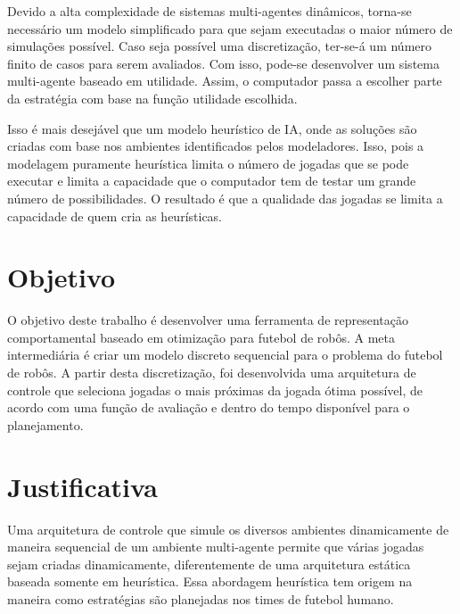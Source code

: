 Devido a alta complexidade de sistemas multi-agentes dinâmicos, torna-se
necessário um modelo simplificado para que sejam executadas o maior número de
simulações possível.  Caso seja possível uma discretização, ter-se-á um número
finito de casos para serem avaliados.  Com isso, pode-se desenvolver um sistema
multi-agente baseado em utilidade.  Assim, o computador passa a escolher parte
da estratégia com base na função utilidade escolhida.

Isso é mais desejável que um modelo heurístico de IA, onde as soluções são
criadas com base nos ambientes identificados pelos modeladores.  Isso, pois a
modelagem puramente heurística limita o número de jogadas que se pode executar e
limita a capacidade que o computador tem de testar um grande número de
possibilidades.  O resultado é que a qualidade das jogadas se limita a
capacidade de quem cria as heurísticas.

\section{Objetivo}

O objetivo deste trabalho é desenvolver uma ferramenta de representação
comportamental baseado em otimização para futebol de robôs.
A meta intermediária é criar um modelo discreto sequencial para o problema do
futebol de robôs.  A partir desta discretização, foi desenvolvida uma arquitetura
de controle que seleciona jogadas o mais próximas da jogada ótima possível, de
acordo com uma função de avaliação e dentro do tempo disponível para o
planejamento.

\section{Justificativa}

Uma arquitetura de controle que simule os diversos ambientes dinamicamente de
maneira sequencial de um ambiente multi-agente permite que várias jogadas sejam
criadas dinamicamente, diferentemente de uma arquitetura estática baseada
somente em heurística.  Essa abordagem heurística tem origem na maneira como
estratégias são planejadas nos times de futebol humano.

